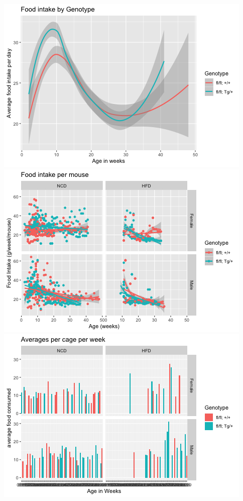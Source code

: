 \documentclass[]{article}
\begin{document}
\includegraphics{figures/weekly-intake-plots-1.png}
\includegraphics{figures/weekly-intake-plots-2.png}
\includegraphics{figures/weekly-intake-plots-3.png}
\end{document}
